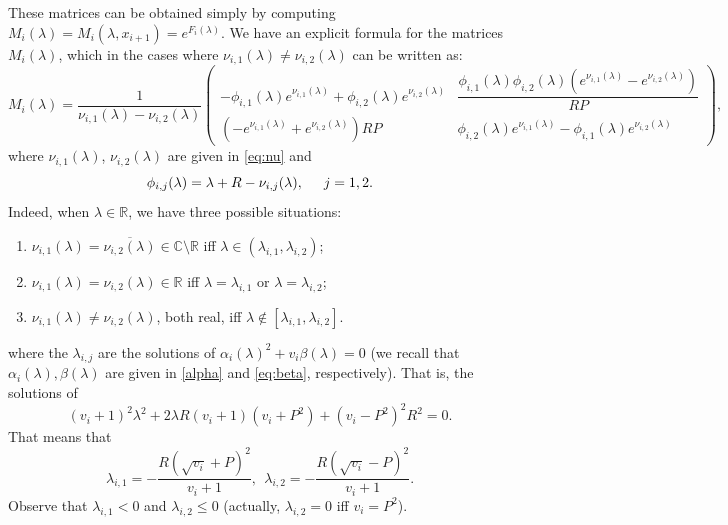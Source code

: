 \documentclass[a4paper]{article}
\newcommand{\X}[3]{#1_{#3,#2}}
\numberwithin{equation}{section}
\begin{document}
These matrices can be obtained simply by computing $M_i(\lambda)=M_i(\lambda,x_{i+1})=e^{F_i(\lambda)}$. We have an explicit formula for the matrices $M_i(\lambda)$, which in the cases where $\X{\nu}{1}{i}(\lambda)\neq \X{\nu}{2}{i}(\lambda)$ can be written as:
\begin{equation}\label{eq:Mi}
M_i(\lambda)=\dfrac{1}{\X{\nu}{1}{i}(\lambda)-\X{\nu}{2}{i}(\lambda)}
\begin{pmatrix}
-\X{\phi}{1}{i}(\lambda) e^{\X{\nu}{1}{i}(\lambda)}+\X{\phi}{2}{i}(\lambda) e^{\X{\nu}{2}{i}(\lambda)}&
\dfrac{\X{\phi}{1}{i}(\lambda) \X{\phi}{2}{i}(\lambda)(e^{\X{\nu}{1}{i}(\lambda)}-e^{\X{\nu}{2}{i}(\lambda)})}{RP}\\
(-e^{\X{\nu}{1}{i}(\lambda)}+e^{\X{\nu}{2}{i}(\lambda)})RP&
\X{\phi}{2}{i}(\lambda) e^{\X{\nu}{1}{i}(\lambda)}-\X{\phi}{1}{i}(\lambda) e^{\X{\nu}{2}{i}(\lambda)}
\end{pmatrix},
\end{equation}
where $\X{\nu}{1}{i}(\lambda)$, $\X{\nu}{2}{i}(\lambda)$ are given in \eqref{eq:nu}
and
\begin{equation}\label{eq:phiji}
\X{\phi}{j}{i}(\lambda)=\lambda+R-\X{\nu}{j}{i}(\lambda),\hspace{.5cm} j=1,2.
\end{equation}
Indeed, when $\lambda\in\mathbb{R}$, we have three possible situations:
\begin{enumerate}
\item $\X{\nu}{1}{i}(\lambda)=\overline{\X{\nu}{2}{i}(\lambda)}\in\mathbb{C}\setminus\mathbb{R}$ iff $\lambda\in (\X{\lambda}{1}{i},\X{\lambda}{2}{i})$;
\item $\X{\nu}{1}{i}(\lambda)=\X{\nu}{2}{i}(\lambda)\in\mathbb{R}$ iff $\lambda=\X{\lambda}{1}{i}$ or $\lambda=\X{\lambda}{2}{i}$;
\item $\X{\nu}{1}{i}(\lambda)\neq\X{\nu}{2}{i}(\lambda)$, both real, iff $\lambda\not\in [\X{\lambda}{1}{i},\X{\lambda}{2}{i}]$.
\end{enumerate}
where the $\X{\lambda}{j}{i}$ are the solutions of $\alpha_i(\lambda)^2+ v_i\beta(\lambda)=0$ (we recall that $\alpha_i(\lambda),\beta(\lambda)$ are given in \eqref{alpha} and \eqref{eq:beta}, respectively). That is, the solutions of
$$(v_i +1)^2\lambda^2 + 2\lambda R (v_i +1)(v_i+P^2)+(v_i-P^2)^2R^2 =0. $$
That means that
$$\X{\lambda}{1}{i}=-\dfrac{R(\sqrt{v_i}+P)^2}{v_i+1},\  \ \X{\lambda}{2}{i}=-\dfrac{R(\sqrt{v_i}-P)^2}{v_i+1}.$$
Observe that $\X{\lambda}{1}{i}<0$ and $\X{\lambda}{2}{i}\leq 0$ (actually, $\X{\lambda}{2}{i} =0$ iff  $v_i =P^2$).
\end{document}
